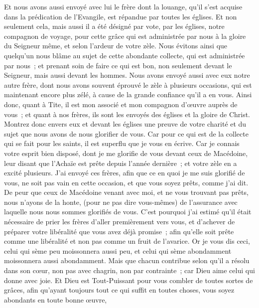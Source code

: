 \begin{multicols}{2}
Et nous avons aussi envoyé avec lui le frère dont la louange, qu'il s'est acquise dans la prédication de l'Evangile, est répandue par toutes les églises.
Et non seulement cela, mais aussi il a été désigné par vote, par les églises, notre compagnon de voyage, pour cette grâce qui est administrée par nous à la gloire du Seigneur même, et selon l'ardeur de votre zèle.
Nous évitons ainsi que quelqu'un nous blâme au sujet de cette abondante collecte, qui est administrée par nous~;
et prenant soin de faire ce qui est bon, non seulement devant le Seigneur, mais aussi devant les hommes.
Nous avons envoyé aussi avec eux notre autre frère, dont nous avons souvent éprouvé le zèle à plusieurs occasions, qui est maintenant encore plus zélé, à cause de la grande confiance qu'il a en vous.
Ainsi donc, quant à Tite, il est mon associé et mon compagnon d'œuvre auprès de vous~; et quant à nos frères, ils sont les envoyés des églises et la gloire de Christ.
Montrez donc envers eux et devant les églises une preuve de votre charité et du sujet que nous avons de nous glorifier de vous.
\VerseOne{}Car pour ce qui est de la collecte qui se fait pour les saints, il est superflu que je vous en écrive.
Car je connais votre esprit bien disposé, dont je me glorifie de vous devant ceux de Macédoine, leur disant que l'Achaïe est prête depuis l'année dernière~; et votre zèle en a excité plusieurs.
J'ai envoyé ces frères, afin que ce en quoi je me suis glorifié de vous, ne soit pas vain en cette occasion, et que vous soyez prêts, comme j'ai dit.
De peur que ceux de Macédoine venant avec moi, et ne vous trouvant pas prêts, nous n'ayons de la honte, (pour ne pas dire vous-mêmes) de l'assurance avec laquelle nous nous sommes glorifiés de vous.
C'est pourquoi j'ai estimé qu'il était nécessaire de prier les frères d'aller premièrement vers vous, et d'achever de préparer votre libéralité que vous avez déjà promise~; afin qu'elle soit prête comme une libéralité et non pas comme un fruit de l'avarice.
Or je vous dis ceci, celui qui sème peu moissonnera aussi peu, et celui qui sème abondamment moissonnera aussi abondamment.
Mais que chacun contribue selon qu'il a résolu dans son cœur, non pas avec chagrin, non par contrainte~; car Dieu aime celui qui donne avec joie.
Et Dieu est Tout-Puissant pour vous combler de toutes sortes de grâces, afin qu'ayant toujours tout ce qui suffit en toutes choses, vous soyez abondants en toute bonne œuvre,

\end{multicols}
